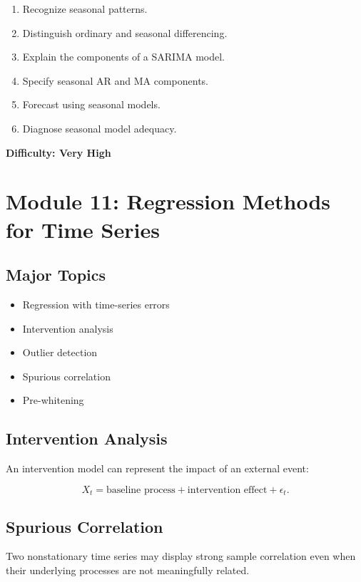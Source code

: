\documentclass[11pt]{article}
\begin{document}
\begin{enumerate}
    \item Recognize seasonal patterns.
    \item Distinguish ordinary and seasonal differencing.
    \item Explain the components of a SARIMA model.
    \item Specify seasonal AR and MA components.
    \item Forecast using seasonal models.
    \item Diagnose seasonal model adequacy.
\end{enumerate}

\textbf{Difficulty: Very High}

\section{Module 11: Regression Methods for Time Series}

\subsection{Major Topics}

\begin{itemize}
    \item Regression with time-series errors
    \item Intervention analysis
    \item Outlier detection
    \item Spurious correlation
    \item Pre-whitening
\end{itemize}

\subsection{Intervention Analysis}

An intervention model can represent the impact of an external event:

\[
X_t
=
\text{baseline process}
+
\text{intervention effect}
+
\epsilon_t.
\]

\subsection{Spurious Correlation}

Two nonstationary time series may display strong sample correlation
even when their underlying processes are not meaningfully related.
\end{document}
